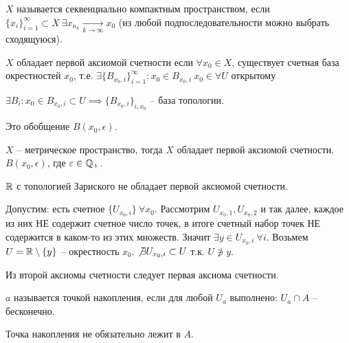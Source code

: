 \documentclass[main]{subfiles}
\begin{document}
\begin{definition}
    $X$ называется секвенциально компактным пространством, если
    $\{x_i\}_{i = 1}^\infty \subset X\ \exists x_{n_k} \xrightarrow[k \to \infty]{} x_0$
    (из любой подпоследовательности можно выбрать сходящуюся).
\end{definition}
\begin{definition}
    $X$ обладает первой аксиомой счетности если $\forall x_0 \in X$, существует счетная база окрестностей $x_0$,
    т.е. $\exists \{B_{x_0, i}\}_{i = 1}^\infty: x_0 \in B_{x_0, i} \ x_0 \in \forall U$ открытому

    $\exists B_i: x_0 \in B_{x_0, i} \subset U \implies \{B_{x_0, i}\}_{i, x_0}$ -- база топологии.

    Это обобщение $B(x_0, \epsilon)$.
\end{definition}

\begin{remark}
    $X$ -- метрическое пространство, тогда $X$ обладает первой аксиомой счетности.
    $B(x_0, \epsilon)$, где $\varepsilon \in \mathbb{Q}_+$.
\end{remark}

\begin{example}
    $\mathbb{R}$ с топологией Зариского не обладает первой аксиомой счетности.

    Допустим: есть счетное $\{U_{x_0, i}\}\ \forall x_0$.
    Рассмотрим $U_{x_0, 1}, U_{x_0, 2}$ и так далее, каждое из них НЕ содержит счетное число точек, в итоге счетный набор точек НЕ содержится в каком-то из этих множеств.
    Значит $\exists y \in U_{x_0, i}\ \forall i$.
    Возьмем $U = \mathbb{R} \setminus \{y\}$ -- окрестность $x_0$.
    $\not\exists U_{x_0, i} \subset U$ т.к. $U \not\ni y$.
\end{example}
\begin{remark}
    Из второй аксиомы счетности следует первая аксиома счетности.
\end{remark}

\begin{definition}
    $a$ называется точкой накопления, если для любой $U_a$ выполнено: $U_a \cap A$ -- бесконечно.
\end{definition}
\begin{remark}
    Точка накопления не обязательно лежит в $A$.
\end{remark}
\end{document}
